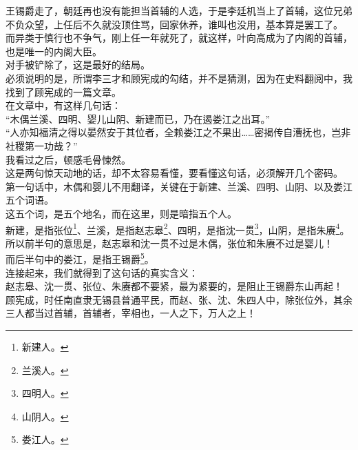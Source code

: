 \begin{multicols}{\theparacolNo}
王锡爵走了，朝廷再也没有能担当首辅的人选，于是李廷机当上了首辅，这位兄弟不负众望，上任后不久就没顶住骂，回家休养，谁叫也没用，基本算是罢工了。\\

而异类于慎行也不争气，刚上任一年就死了，就这样，叶向高成为了内阁的首辅，也是唯一的内阁大臣。\\

对手被铲除了，这是最好的结局。\\

必须说明的是，所谓李三才和顾宪成的勾结，并不是猜测，因为在史料翻阅中，我找到了顾宪成的一篇文章。\\

在文章中，有这样几句话：\\

“木偶兰溪、四明、婴儿山阴、新建而已，乃在遏娄江之出耳。”\\

“人亦知福清之得以晏然安于其位者，全赖娄江之不果出……密揭传自漕抚也，岂非社稷第一功哉？”\\

我看过之后，顿感毛骨悚然。\\

这是两句惊天动地的话，却不太容易看懂，要看懂这句话，必须解开几个密码。\\

第一句话中，木偶和婴儿不用翻译，关键在于新建、兰溪、四明、山阴、以及娄江五个词语。\\

这五个词，是五个地名，而在这里，则是暗指五个人。\\

新建，是指张位\footnote{新建人。}、兰溪，是指赵志皋\footnote{兰溪人。}、四明，是指沈一贯\footnote{四明人。}，山阴，是指朱赓\footnote{山阴人。}。\\

所以前半句的意思是，赵志皋和沈一贯不过是木偶，张位和朱赓不过是婴儿！\\

而后半句中的娄江，是指王锡爵\footnote{娄江人。}。\\

连接起来，我们就得到了这句话的真实含义：\\

赵志皋、沈一贯、张位、朱赓都不要紧，最为紧要的，是阻止王锡爵东山再起！\\

顾宪成，时任南直隶无锡县普通平民，而赵、张、沈、朱四人中，除张位外，其余三人都当过首辅，首辅者，宰相也，一人之下，万人之上！\\


\end{multicols}
